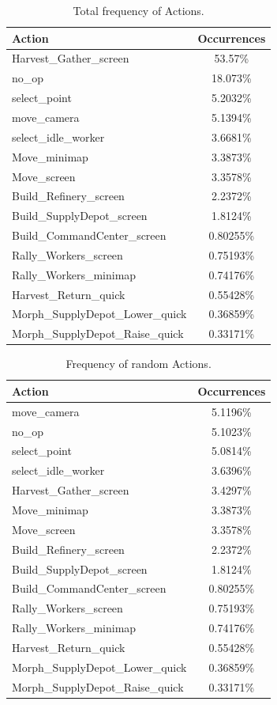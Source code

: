 \documentclass{article}
\begin{document}
\begin{table}
\begin{tabular}{|l|c|}
\hline
Action & Occurrences \\
\hline
Harvest\_Gather\_screen & 53.57\% \\
no\_op & 18.073\% \\
select\_point & 5.2032\% \\
move\_camera & 5.1394\% \\
select\_idle\_worker & 3.6681\% \\
Move\_minimap & 3.3873\% \\
Move\_screen & 3.3578\% \\
Build\_Refinery\_screen & 2.2372\% \\
Build\_SupplyDepot\_screen & 1.8124\% \\
Build\_CommandCenter\_screen & 0.80255\% \\
Rally\_Workers\_screen & 0.75193\% \\
Rally\_Workers\_minimap & 0.74176\% \\
Harvest\_Return\_quick & 0.55428\% \\
Morph\_SupplyDepot\_Lower\_quick & 0.36859\% \\
Morph\_SupplyDepot\_Raise\_quick & 0.33171\% \\
\hline
\end{tabular}
\caption{Total frequency of Actions.}
\label{total_actions}
\end{table}


\begin{table}
\begin{tabular}{|l|c|}
\hline
Action & Occurrences \\
\hline
move\_camera & 5.1196\% \\
no\_op & 5.1023\% \\
select\_point & 5.0814\% \\
select\_idle\_worker & 3.6396\% \\
Harvest\_Gather\_screen & 3.4297\% \\
Move\_minimap & 3.3873\% \\
Move\_screen & 3.3578\% \\
Build\_Refinery\_screen & 2.2372\% \\
Build\_SupplyDepot\_screen & 1.8124\% \\
Build\_CommandCenter\_screen & 0.80255\% \\
Rally\_Workers\_screen & 0.75193\% \\
Rally\_Workers\_minimap & 0.74176\% \\
Harvest\_Return\_quick & 0.55428\% \\
Morph\_SupplyDepot\_Lower\_quick & 0.36859\% \\
Morph\_SupplyDepot\_Raise\_quick & 0.33171\% \\
\hline
\end{tabular}
\caption{Frequency of random Actions.}
\label{random_actions}
\end{table}
\end{document}
